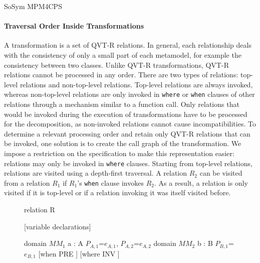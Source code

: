 \begin{copiedFrom}{SoSym MPM4CPS}
\paragraph{Traversal Order Inside Transformations}
A transformation is a set of QVT-R relations. In general, each relationship deals with the consistency of only a small part of each metamodel, for example the consistency between two classes. 
Unlike QVT-R transformations, QVT-R relations cannot be processed in any order. There are two types of relations: top-level relations and non-top-level relations. 
Top-level relations are always invoked, whereas non-top-level relations are only invoked in \texttt{where} or \texttt{when} clauses of other relations through a mechanism similar to a function call. Only relations that would be invoked during the execution of transformations have to be processed for the decomposition, as non-invoked relations cannot cause incompatibilities. To determine a relevant processing order and retain only QVT-R relations that can be invoked, one solution is to create the call graph of the transformation.
We impose a restriction on the specification to make this representation easier: relations may only be invoked in \texttt{where} clauses. Starting from top-level relations, relations are visited using a depth-first traversal. A relation $R_2$ can be visited from a relation $R_1$ if $R_1$'s \texttt{when} clause invokes $R_2$. As a result, a relation is only visited if it is top-level or if a relation invoking it was itself visited before.


\begin{figure} %
\begin{embeddedqvtcode}[frame=bt, numbers=none, mathescape=true, caption={Structure of a QVT-R relation with property template items},captionpos=b,label={lst:correctness:prevention:rel_to_hyperedge}]
relation R {
    [variable declarations]
    
    domain $MM_1$ a : A {$P_{A, 1}$=$e_{A, 1}$, $P_{A, 2}$=$e_{A, 2}$}
    domain $MM_2$ b : B {$P_{B, 1}$=$e_{B, 1}$}
    [when { PRE }] [where { INV }]
}
\end{embeddedqvtcode}
\end{figure}


\end{copiedFrom}
